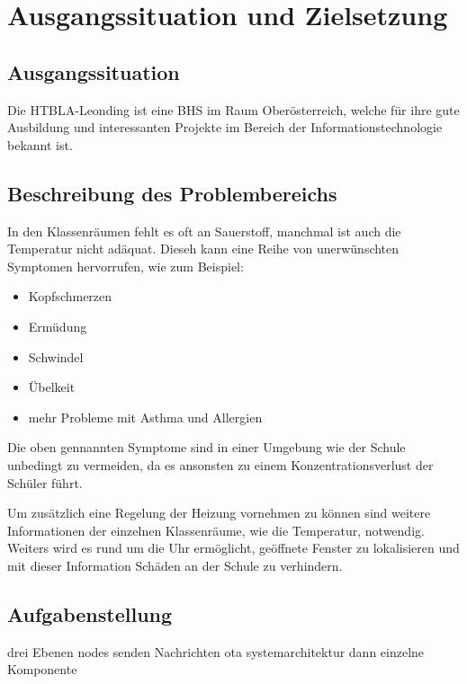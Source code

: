 \chapter{Ausgangssituation und Zielsetzung}

\section{Ausgangssituation}
Die HTBLA-Leonding ist eine BHS im Raum Oberösterreich, welche für ihre gute Ausbildung und interessanten Projekte im Bereich der Informationstechnologie bekannt ist.

\section{Beschreibung des Problembereichs}
In den Klassenräumen fehlt es oft an Sauerstoff, manchmal ist auch die Temperatur nicht adäquat. Dieseh kann eine Reihe von unerwünschten Symptomen hervorrufen, wie zum Beispiel: 

\begin{itemize}
    \item Kopfschmerzen
    \item Ermüdung
    \item Schwindel
    \item Übelkeit
    \item mehr Probleme mit Asthma und Allergien
\end{itemize}

Die oben gennannten Symptome sind in einer Umgebung wie der Schule unbedingt zu vermeiden, da es ansonsten zu einem Konzentrationsverlust der Schüler führt.

Um zusätzlich eine Regelung der Heizung vornehmen zu können sind weitere Informationen der einzelnen Klassenräume, wie die Temperatur, notwendig. Weiters wird es rund um die Uhr ermöglicht,  geöffnete Fenster zu lokalisieren und mit dieser Information Schäden an der Schule zu verhindern.

\section{Aufgabenstellung}
drei Ebenen
nodes senden Nachrichten
ota
systemarchitektur
dann einzelne Komponente

